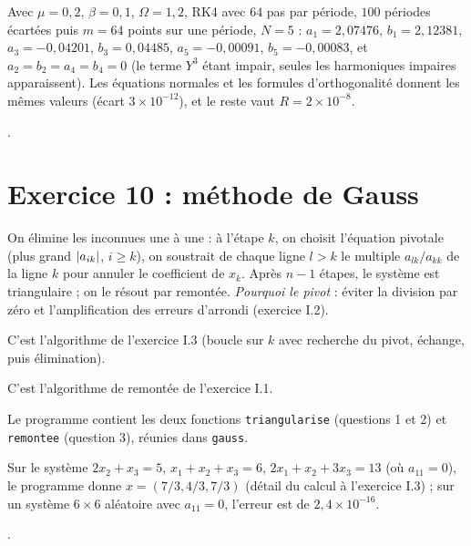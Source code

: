 \Verif Avec $\mu = 0{,}2$, $\beta = 0{,}1$, $\Omega = 1{,}2$, RK4 avec $64$ pas par
période, $100$ périodes écartées puis $m = 64$ points sur une période,
$N = 5$ : $a_1 = 2{,}07476$, $b_1 = 2{,}12381$, $a_3 = -0{,}04201$,
$b_3 = 0{,}04485$, $a_5 = -0{,}00091$, $b_5 = -0{,}00083$, et $a_2 = b_2 = a_4 =
b_4 = 0$ (le terme $Y^3$ étant impair, seules les harmoniques impaires
apparaissent). Les équations normales et les formules d'orthogonalité donnent
les mêmes valeurs (écart $3\times 10^{-12}$), et le reste vaut
$R = 2\times 10^{-8}$.

\Refs {}.

\section{Exercice 10 : méthode de Gauss}

 On élimine les inconnues une à une : à l'étape $k$, on
choisit l'équation pivotale (plus grand $\left|a_{ik}\right|$, $i \ge k$), on soustrait
de chaque ligne $l > k$ le multiple $a_{lk}/a_{kk}$ de la ligne $k$ pour
annuler le coefficient de $x_k$. Après $n-1$ étapes, le système est
triangulaire ; on le résout par remontée. \emph{Pourquoi le pivot} : éviter la
division par zéro et l'amplification des erreurs d'arrondi (exercice I.2).

 C'est l'algorithme de l'exercice
I.3 (boucle sur $k$ avec recherche du pivot, échange, puis élimination).

 C'est l'algorithme de
remontée de l'exercice I.1.

Le programme contient les deux fonctions \texttt{triangularise} (questions 1
et 2) et \texttt{remontee} (question 3), réunies dans \texttt{gauss}.

\Verif Sur le système $2x_2 + x_3 = 5$, $x_1 + x_2 + x_3 = 6$,
$2x_1 + x_2 + 3x_3 = 13$ (où $a_{11} = 0$), le programme donne
$x = (7/3, 4/3, 7/3)$ (détail du calcul à l'exercice I.3) ; sur un système
$6\times 6$ aléatoire avec $a_{11} = 0$, l'erreur est de $2{,}4\times 10^{-16}$.

\Refs {}.

